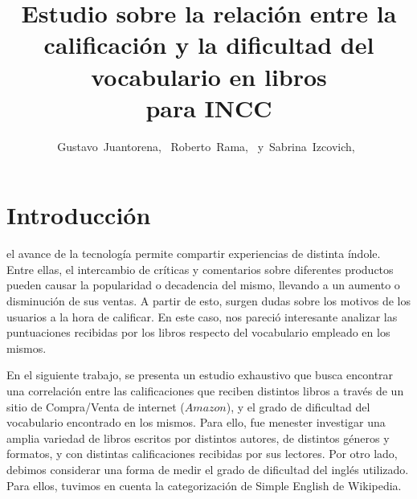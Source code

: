\documentclass[12pt,journal,compsoc]{IEEEtran}
\begin{document}
\title{Estudio sobre la relación entre la calificación y la dificultad del vocabulario en libros\\ para INCC}

\author{Gustavo~Juantorena,~
        Roberto~Rama,~
        y~Sabrina~Izcovich,~}


\maketitle
\IEEEdisplaynontitleabstractindextext
\IEEEpeerreviewmaketitle

\section{Introducción}
 el avance de la tecnología permite compartir experiencias de distinta índole. Entre ellas, el intercambio de críticas y comentarios sobre diferentes productos pueden causar la popularidad o decadencia del mismo, llevando a un aumento o disminución de sus ventas. A partir de esto, surgen dudas sobre los motivos de los usuarios a la hora de calificar. En este caso, nos pareció interesante analizar las puntuaciones recibidas por los libros respecto del vocabulario empleado en los mismos. 

En el siguiente trabajo, se presenta un estudio exhaustivo que busca encontrar una correlación entre las calificaciones que reciben distintos libros a través de un sitio de Compra/Venta de internet ($Amazon$), y el grado de dificultad del vocabulario encontrado en los mismos. Para ello, fue menester investigar una amplia variedad de libros escritos por distintos autores, de distintos géneros y formatos, y con distintas calificaciones recibidas por sus lectores. Por otro lado, debimos considerar una forma de medir el grado de dificultad del inglés utilizado. Para ellos, tuvimos en cuenta la categorización de Simple English de Wikipedia.
\end{document}
